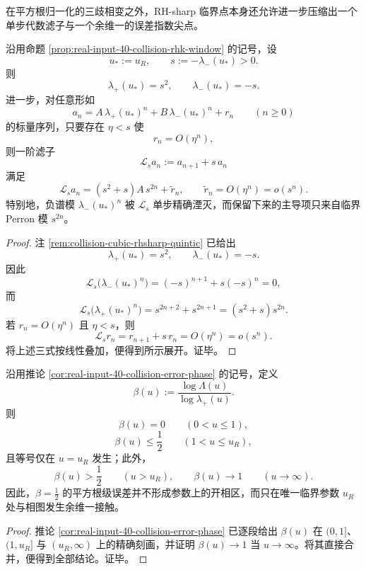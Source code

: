 在平方根归一化的三歧相变之外，RH-sharp 临界点本身还允许进一步压缩出一个单步代数滤子与一个余维一的误差指数尖点。

\begin{theorem}[临界平方根模的一阶湮灭]\label{thm:xi-time-part65-critical-sqrt-mode-first-order-annihilation}
沿用命题 \ref{prop:real-input-40-collision-rhk-window} 的记号，设
\[
u_\ast:=u_R,
\qquad
s:=-\lambda_-(u_\ast)>0.
\]
则
\[
\lambda_+(u_\ast)=s^2,
\qquad
\lambda_-(u_\ast)=-s.
\]
进一步，对任意形如
\[
a_n=A\,\lambda_+(u_\ast)^n+B\,\lambda_-(u_\ast)^n+r_n
\qquad (n\ge 0)
\]
的标量序列，只要存在 \(\eta<s\) 使
\[
r_n=O(\eta^n),
\]
则一阶滤子
\[
\mathcal L_s a_n:=a_{n+1}+s\,a_n
\]
满足
\[
\mathcal L_s a_n
=(s^2+s)A\,s^{2n}+\widetilde r_n,
\qquad
\widetilde r_n=O(\eta^n)=o(s^n).
\]
特别地，负谱模 \(\lambda_-(u_\ast)^n\) 被 \(\mathcal L_s\) 单步精确湮灭，而保留下来的主导项只来自临界 Perron 模 \(s^{2n}\)。
\end{theorem}
\begin{proof}
注 \ref{rem:collision-cubic-rhsharp-quintic} 已给出
\[
\lambda_+(u_\ast)=s^2,
\qquad
\lambda_-(u_\ast)=-s.
\]
因此
\[
\mathcal L_s\bigl(\lambda_-(u_\ast)^n\bigr)
=(-s)^{n+1}+s(-s)^n
=0,
\]
而
\[
\mathcal L_s\bigl(\lambda_+(u_\ast)^n\bigr)
=s^{2n+2}+s^{2n+1}
=(s^2+s)s^{2n}.
\]
若 \(r_n=O(\eta^n)\) 且 \(\eta<s\)，则
\[
\mathcal L_s r_n=r_{n+1}+s\,r_n=O(\eta^n)=o(s^n).
\]
将上述三式按线性叠加，便得到所示展开。证毕。
\end{proof}

\begin{corollary}[平方根律的尖点接触与非厚相性]\label{cor:xi-time-part65-sqrt-law-cusp-nonthick-phase}
沿用推论 \ref{cor:real-input-40-collision-error-phase} 的记号，定义
\[
\beta(u):=\frac{\log \Lambda(u)}{\log \lambda_+(u)}.
\]
则
\[
\beta(u)=0
\qquad (0<u\le 1),
\]
\[
\beta(u)\le \frac12
\qquad (1<u\le u_R),
\]
且等号仅在 \(u=u_R\) 发生；此外，
\[
\beta(u)>\frac12
\qquad (u>u_R),
\qquad
\beta(u)\to 1
\qquad (u\to\infty).
\]
因此，\(\beta=\frac12\) 的平方根级误差并不形成参数上的开相区，而只在唯一临界参数 \(u_R\) 处与相图发生余维一接触。
\end{corollary}
\begin{proof}
推论 \ref{cor:real-input-40-collision-error-phase} 已逐段给出 \(\beta(u)\) 在
\((0,1]\)、\((1,u_R]\) 与 \((u_R,\infty)\) 上的精确刻画，并证明
\(\beta(u)\to 1\) 当 \(u\to\infty\)。将其直接合并，便得到全部结论。证毕。
\end{proof}

\endinput
